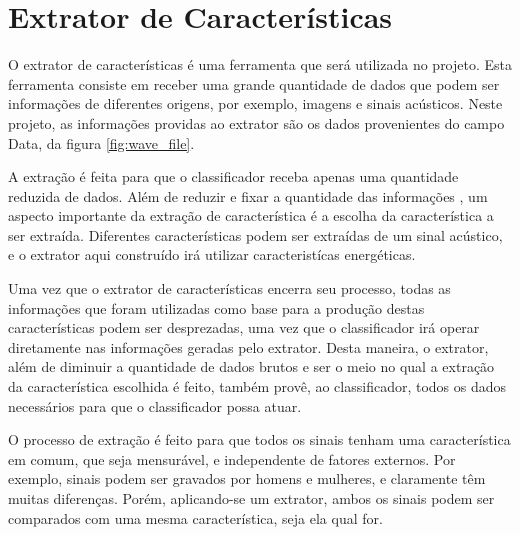 \documentclass[a4paper,12pt,oneside]{report}
\begin{document}
\section{Extrator de Caracter\'{i}sticas}
\hspace*{+15pt} O extrator de caracter\'{i}sticas \'{e} uma ferramenta que ser\'{a} utilizada no projeto. Esta ferramenta consiste em receber uma grande quantidade de dados que podem ser informa\c{c}\~{o}es de diferentes origens, por exemplo, imagens e sinais ac\'{u}sticos. Neste projeto, as informa\c{c}\~{o}es providas ao extrator s\~{a}o os dados provenientes do campo Data, da figura \ref{fig:wave_file}. 
\\
\par A extra\c{c}\~{a}o \'{e} feita para que o classificador receba apenas uma quantidade reduzida de dados. Al\'{e}m de reduzir e fixar a quantidade das informa\c{c}\~{o}es , um aspecto importante da extra\c{c}\~{a}o de caracter\'{i}stica \'{e} a escolha da caracter\'{i}stica a ser extra\'{i}da. Diferentes caracter\'{i}sticas podem ser extra\'{i}das de um sinal ac\'{u}stico, e o extrator aqui constru\'{i}do ir\'{a} utilizar caracterist\'{i}cas energ\'{e}ticas. 
\\
\par Uma vez que o extrator de caracter\'{i}sticas encerra seu processo, todas as in\-for\-ma\-\c{c}\~{o}es que foram utilizadas como base para a produ\c{c}\~{a}o destas caracter\'{i}sticas podem ser desprezadas, uma vez que o classificador ir\'{a} operar diretamente nas informa\c{c}\~{o}es geradas pelo extrator. Desta maneira, o extrator, al\'{e}m de diminuir a quantidade de dados brutos e ser o meio no qual a extra\c{c}\~{a}o da caracter\'{i}stica escolhida \'{e} feito, tamb\'{e}m provê, ao classificador, todos os dados necess\'{a}rios para que o classificador possa atuar. 
\\
\par O processo de extra\c{c}\~{a}o \'{e} feito para que todos os sinais tenham uma caracter\'{i}stica em comum, que seja mensur\'{a}vel, e independente de fatores externos. Por exemplo, sinais podem ser gravados por homens e mulheres, e claramente têm muitas diferen\c{c}as. Por\'{e}m, aplicando-se um extrator, ambos os sinais podem ser comparados com uma mesma caracter\'{i}stica, seja ela qual for.  
\end{document}
